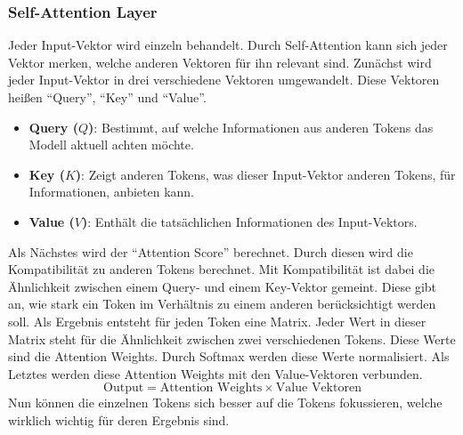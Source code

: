 \subsubsection{Self-Attention Layer}
Jeder Input-Vektor wird einzeln behandelt.
Durch Self-Attention kann sich jeder Vektor merken, welche anderen Vektoren für ihn relevant sind.
Zunächst wird jeder Input-Vektor in drei verschiedene Vektoren umgewandelt.
Diese Vektoren heißen \enquote{Query}, \enquote{Key} und \enquote{Value}.
\begin{itemize}
  \item \textbf{Query ($Q$)}: Bestimmt, auf welche Informationen aus anderen Tokens das Modell aktuell achten möchte.
  \item \textbf{Key ($K$)}: Zeigt anderen Tokens, was dieser Input-Vektor anderen Tokens, für Informationen, anbieten kann.
  \item \textbf{Value ($V$)}: Enthält die tatsächlichen Informationen des Input-Vektors.
\end{itemize}
Als Nächstes wird der \enquote{Attention Score} berechnet.
Durch diesen wird die Kompatibilität zu anderen Tokens berechnet.
Mit Kompatibilität ist dabei die Ähnlichkeit zwischen einem Query- und einem Key-Vektor gemeint.
Diese gibt an, wie stark ein Token im Verhältnis zu einem anderen berücksichtigt werden soll.
Als Ergebnis entsteht für jeden Token eine Matrix.
Jeder Wert in dieser Matrix steht für die Ähnlichkeit zwischen zwei verschiedenen Tokens.
Diese Werte sind die Attention Weights.
Durch Softmax werden diese Werte normalisiert.
Als Letztes werden diese Attention Weights mit den Value-Vektoren verbunden.
\[
\text{Output} = \text{Attention Weights} \times \text{Value Vektoren}
\]
Nun können die einzelnen Tokens sich besser auf die Tokens fokussieren, welche wirklich wichtig für deren Ergebnis sind.

